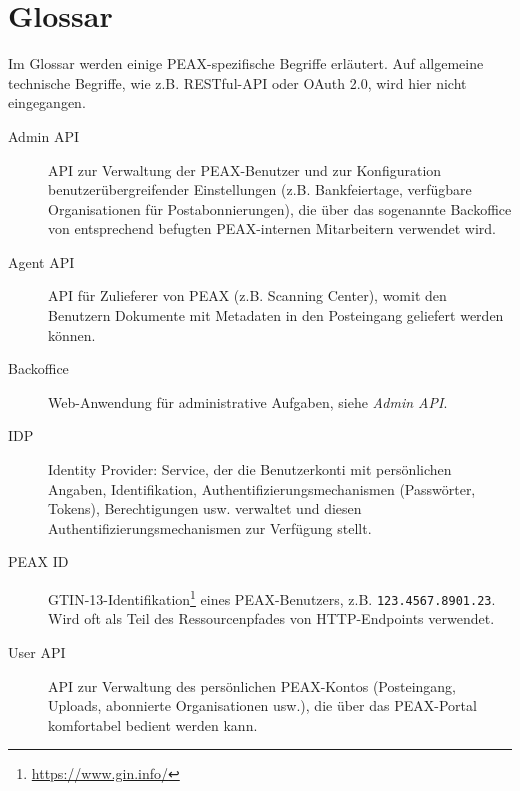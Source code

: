 \section*{Glossar}

Im Glossar werden einige PEAX-spezifische Begriffe erläutert. Auf allgemeine technische Begriffe, wie z.B. RESTful-API oder OAuth 2.0, wird hier nicht eingegangen.

\begin{description}
    \item[Admin API] API zur Verwaltung der PEAX-Benutzer und zur Konfiguration benutzerübergreifender Einstellungen (z.B. Bankfeiertage, verfügbare Organisationen für Postabonnierungen), die über das sogenannte Backoffice von entsprechend befugten PEAX-internen Mitarbeitern verwendet wird.
    \item[Agent API] API für Zulieferer von PEAX (z.B. Scanning Center), womit den Benutzern Dokumente mit Metadaten in den Posteingang geliefert werden können.
    \item[Backoffice] Web-Anwendung für administrative Aufgaben, siehe \textit{Admin API}.
    \item[IDP] Identity Provider: Service, der die Benutzerkonti mit persönlichen Angaben, Identifikation, Authentifizierungsmechanismen (Passwörter, Tokens), Berechtigungen usw. verwaltet und diesen Authentifizierungsmechanismen zur Verfügung stellt.
    \item[PEAX ID] GTIN-13-Identifikation\footnote{\url{https://www.gin.info/}} eines PEAX-Benutzers, z.B. \texttt{123.4567.8901.23}. Wird oft als Teil des Ressourcenpfades von HTTP-Endpoints verwendet.
    \item[User API] API zur Verwaltung des persönlichen PEAX-Kontos (Posteingang, Uploads, abonnierte Organisationen usw.), die über das PEAX-Portal komfortabel bedient werden kann.
\end{description}
